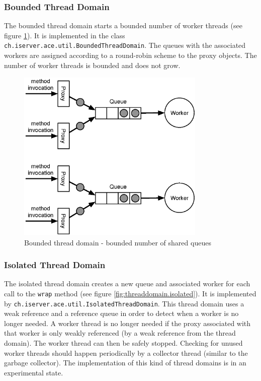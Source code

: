 \subsubsection{Bounded Thread Domain}
The bounded thread domain starts a bounded number of worker threads
(see figure \ref{fig:threaddomain.bounded}). It
is implemented in the class \texttt{ch.iserver.ace.util.BoundedThreadDomain}.
The queues with the associated workers are assigned according to
a round-robin scheme to the proxy objects. The number of worker threads
is bounded and does not grow.

\begin{figure}[htb]
 \centering
 \includegraphics[width=9cm,height=8.3cm]{../images/finalreport/threaddomain_bounded.eps}
 \caption{Bounded thread domain - bounded number of shared queues}
 \label{fig:threaddomain.bounded}
\end{figure}

\subsubsection{Isolated Thread Domain}
The isolated thread domain creates a new queue and associated worker
for each call to the \texttt{wrap} method 
(see figure \ref{fig:threaddomain.isolated}). It is implemented by
\texttt{ch.iserver.ace.util.IsolatedThreadDomain}. This thread domain
uses a weak reference and a reference queue in order to detect when
a worker is no longer needed. A worker thread is no longer needed if the
proxy associated with that worker is only weakly referenced (by a weak
reference from the thread domain). The worker thread can then be
safely stopped. Checking for unused worker threads should happen 
periodically by a collector thread (similar to the garbage collector). The
implementation of this kind of thread domains is in an experimental state.

